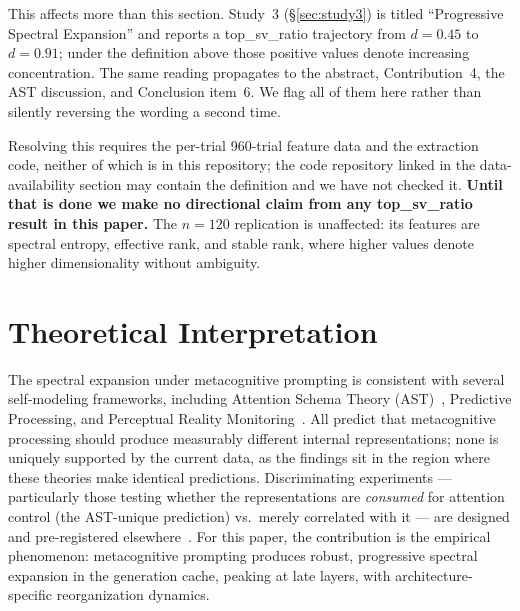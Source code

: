 \documentclass[11pt,a4paper]{article}
\begin{document}
This affects more than this section. Study~3 (\S\ref{sec:study3}) is titled
``Progressive Spectral Expansion'' and reports a top\_sv\_ratio trajectory
from $d = 0.45$ to $d = 0.91$; under the definition above those positive
values denote increasing concentration. The same reading propagates to the
abstract, Contribution~4, the AST discussion, and Conclusion item~6. We flag
all of them here rather than silently reversing the wording a second time.

Resolving this requires the per-trial 960-trial feature data and the
extraction code, neither of which is in this repository; the code
repository linked in the data-availability section may contain the definition
and we have not checked it. \textbf{Until that is done we make no
directional claim from any top\_sv\_ratio result in this paper.} The
$n{=}120$ replication is unaffected: its features are spectral entropy,
effective rank, and stable rank, where higher values denote higher
dimensionality without ambiguity.

\section{Theoretical Interpretation}

The spectral expansion under metacognitive prompting is consistent
with several self-modeling frameworks, including Attention Schema Theory
(AST)~\citep{webb2015attention,graziano2017attention}, Predictive
Processing, and Perceptual Reality Monitoring~\citep{lau2022consciousness}.
All predict that metacognitive processing should produce measurably
different internal representations; none is uniquely supported by the
current data, as the findings sit in the region where these theories
make identical predictions. Discriminating experiments --- particularly
those testing whether the representations are \emph{consumed} for
attention control (the AST-unique prediction) vs.\ merely correlated
with it --- are designed and pre-registered
elsewhere~\citep{lyra2026ast_experiments}. For this paper, the
contribution is the empirical phenomenon: metacognitive prompting
produces robust, progressive spectral expansion in the generation
cache, peaking at late layers, with architecture-specific reorganization
dynamics.

\end{document}
